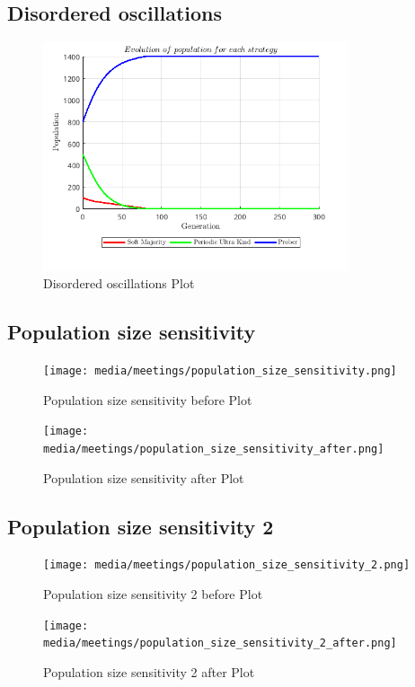 \subsection{Disordered oscillations}
\begin{figure}[H]
    \centering
    \includegraphics[width=0.8\textwidth]{media/meetings/disordered_oscillations.png}
    \caption{Disordered oscillations Plot}
\end{figure}

\subsection{Population size sensitivity}
\begin{figure}[H]
    \centering
    \texttt{[image: media/meetings/population\_size\_sensitivity.png]}
    \caption{Population size sensitivity before Plot}
\end{figure}
\begin{figure}[H]
    \centering
    \texttt{[image: media/meetings/population\_size\_sensitivity\_after.png]}
    \caption{Population size sensitivity after Plot}
\end{figure}

\subsection{Population size sensitivity 2}
\begin{figure}[H]
    \centering
    \texttt{[image: media/meetings/population\_size\_sensitivity\_2.png]}
    \caption{Population size sensitivity 2 before Plot}
\end{figure}
\begin{figure}[H]
    \centering
    \texttt{[image: media/meetings/population\_size\_sensitivity\_2\_after.png]}
    \caption{Population size sensitivity 2 after Plot}
\end{figure}

